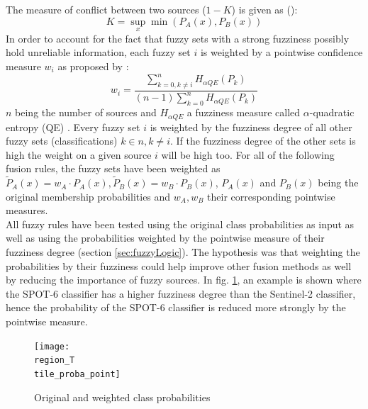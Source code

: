 \documentclass[10pt]{article}
\newcommand{\tile}{41000_30000}
\newcommand{\region}{finistere}
\begin{document}
The measure of conflict between two sources ($1-K$) is given as (\cite{ouerghemmi_two-step_2017,dubois_possibility}):
\begin{equation}
    K=\sup_x\min(P_A(x), P_B(x))
\end{equation}
In order to account for the fact that fuzzy sets with a strong fuzziness possibly hold unreliable information, each fuzzy set $i$ is weighted by a pointwise confidence measure $w_i$ as proposed by \cite{fauvel_decision_fusion}:
\begin{equation}
    w_i=\frac{\sum_{k=0,k\neq i}^{n}H_{\alpha QE}(P_k)}{(n-1)\sum_{k=0}^{n}H_{\alpha QE}(P_k)}
\end{equation}
$n$ being the number of sources and $H_{\alpha QE}$ a fuzziness measure called $\alpha$-quadratic entropy (QE) \parencite{pal_measuring_1994}. Every fuzzy set $i$ is weighted by the fuzziness degree of all other fuzzy sets (classifications) $k\in n,k\neq i$. If the fuzziness degree of the other sets is high the weight on a given source $i$ will be high too. For all of the following fusion rules, the fuzzy sets have been weighted as $\tilde{P}_A(x)=w_A\cdot P_A(x), \tilde{P}_B(x)=w_B\cdot P_B(x)$, $P_A(x)$ and $P_B(x)$ being the original membership probabilities and $w_A, w_B$ their corresponding pointwise measures.\\

All fuzzy rules have been tested using the original class probabilities as input  as well as using the probabilities weighted by the pointwise measure of their fuzziness degree (section \ref{sec:fuzzyLogic}). The hypothesis was that weighting the probabilities by their fuzziness could help improve other fusion methods as well by reducing the importance of fuzzy sources. In fig. \ref{fig:proba_point}, an example is shown where the SPOT-6 classifier has a higher fuzziness degree than the Sentinel-2 classifier, hence the probability of the SPOT-6 classifier is reduced more strongly by the pointwise measure.
\begin{figure}[H]
    \centering
    \texttt{[image: \\region\_T\\tile\_proba\_point]}
    \caption{Original and weighted class probabilities}
    \label{fig:proba_point}
\end{figure}
\end{document}
